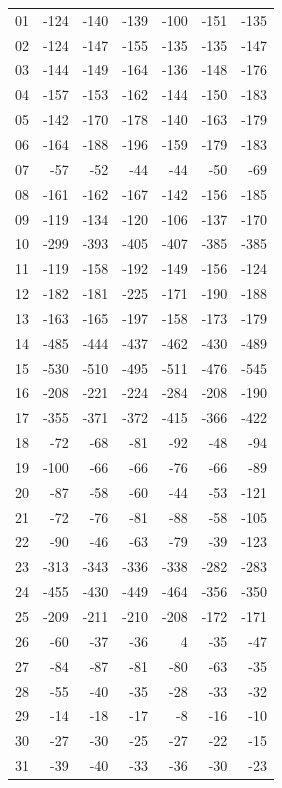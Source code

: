 \begin{longtable}{lrrrrrr}
01 & -124 & -140 & -139 & -100 & -151 & -135 \\
02 & -124 & -147 & -155 & -135 & -135 & -147 \\
03 & -144 & -149 & -164 & -136 & -148 & -176 \\
04 & -157 & -153 & -162 & -144 & -150 & -183 \\
05 & -142 & -170 & -178 & -140 & -163 & -179 \\
06 & -164 & -188 & -196 & -159 & -179 & -183 \\
07 & -57 & -52 & -44 & -44 & -50 & -69 \\
08 & -161 & -162 & -167 & -142 & -156 & -185 \\
09 & -119 & -134 & -120 & -106 & -137 & -170 \\
10 & -299 & -393 & -405 & -407 & -385 & -385 \\
11 & -119 & -158 & -192 & -149 & -156 & -124 \\
12 & -182 & -181 & -225 & -171 & -190 & -188 \\
13 & -163 & -165 & -197 & -158 & -173 & -179 \\
14 & -485 & -444 & -437 & -462 & -430 & -489 \\
15 & -530 & -510 & -495 & -511 & -476 & -545 \\
16 & -208 & -221 & -224 & -284 & -208 & -190 \\
17 & -355 & -371 & -372 & -415 & -366 & -422 \\
18 & -72 & -68 & -81 & -92 & -48 & -94 \\
19 & -100 & -66 & -66 & -76 & -66 & -89 \\
20 & -87 & -58 & -60 & -44 & -53 & -121 \\
21 & -72 & -76 & -81 & -88 & -58 & -105 \\
22 & -90 & -46 & -63 & -79 & -39 & -123 \\
23 & -313 & -343 & -336 & -338 & -282 & -283 \\
24 & -455 & -430 & -449 & -464 & -356 & -350 \\
25 & -209 & -211 & -210 & -208 & -172 & -171 \\
26 & -60 & -37 & -36 & 4 & -35 & -47 \\
27 & -84 & -87 & -81 & -80 & -63 & -35 \\
28 & -55 & -40 & -35 & -28 & -33 & -32 \\
29 & -14 & -18 & -17 & -8 & -16 & -10 \\
30 & -27 & -30 & -25 & -27 & -22 & -15 \\
31 & -39 & -40 & -33 & -36 & -30 & -23 \\

\end{longtable}
